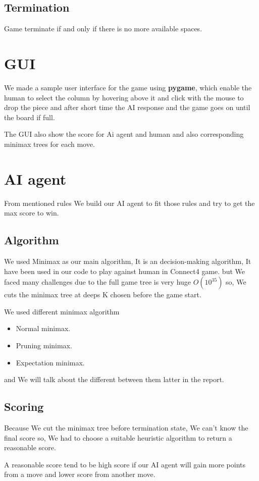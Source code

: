 \documentclass{article}
\begin{document}
\subsection*{Termination} 
Game terminate if and only if there is no more available spaces.

\section{GUI}
We made a sample user interface for the game using \textbf{pygame}, which enable the human to select the column by
hovering above it and click with the mouse to drop the piece and after short time the AI response and the game goes on until the board if full.

The GUI also show the score for Ai agent and human and also corresponding minimax trees for each move. 


\section{AI agent}
From mentioned rules We build our AI agent to fit those rules and try to get the max score to win.
\subsection*{Algorithm}
We used Minimax as our main algorithm, It is an decision-making algorithm, It have been used in our code to play against human in Connect4 game.
but We faced many challenges due to the full game tree is very huge $O(10^{35})$ so, We cuts the minimax tree at deeps K chosen before the game start.

We used different minimax algorithm
\begin{itemize}
    \item Normal minimax.
    \item Pruning minimax.
    \item Expectation minimax.
\end{itemize}
and We will talk about the different between them latter in the report.

\subsection*{Scoring}
Because We cut the minimax tree before termination state, We can't know the final score so, 
We had to choose a suitable heuristic algorithm to return a reasonable score.

A reasonable score tend to be high score if our AI agent will gain more points from a move and lower score from another move.
\end{document}
